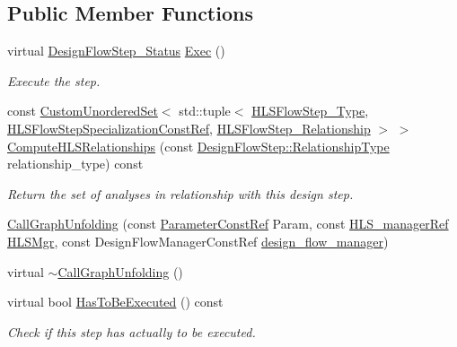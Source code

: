 \subsection*{Public Member Functions}
\begin{DoxyCompactItemize}
\item 
virtual \hyperlink{design__flow__step_8hpp_afb1f0d73069c26076b8d31dbc8ebecdf}{Design\+Flow\+Step\+\_\+\+Status} \hyperlink{classCallGraphUnfolding_a22a28a943380b9859f6006542f1929ab}{Exec} ()
\begin{DoxyCompactList}\small\item\em Execute the step. \end{DoxyCompactList}\item 
const \hyperlink{classCustomUnorderedSet}{Custom\+Unordered\+Set}$<$ std\+::tuple$<$ \hyperlink{hls__step_8hpp_ada16bc22905016180e26fc7e39537f8d}{H\+L\+S\+Flow\+Step\+\_\+\+Type}, \hyperlink{hls__step_8hpp_a5fdd2edf290c196531d21d68e13f0e74}{H\+L\+S\+Flow\+Step\+Specialization\+Const\+Ref}, \hyperlink{hls__step_8hpp_a3ad360b9b11e6bf0683d5562a0ceb169}{H\+L\+S\+Flow\+Step\+\_\+\+Relationship} $>$ $>$ \hyperlink{classCallGraphUnfolding_af8507af00670b0bd8b00b56d20c829f1}{Compute\+H\+L\+S\+Relationships} (const \hyperlink{classDesignFlowStep_a723a3baf19ff2ceb77bc13e099d0b1b7}{Design\+Flow\+Step\+::\+Relationship\+Type} relationship\+\_\+type) const
\begin{DoxyCompactList}\small\item\em Return the set of analyses in relationship with this design step. \end{DoxyCompactList}\item 
\hyperlink{classCallGraphUnfolding_a18926eb72c9ee114b6d25d651f7e4c8a}{Call\+Graph\+Unfolding} (const \hyperlink{Parameter_8hpp_a37841774a6fcb479b597fdf8955eb4ea}{Parameter\+Const\+Ref} Param, const \hyperlink{hls__manager_8hpp_acd3842b8589fe52c08fc0b2fcc813bfe}{H\+L\+S\+\_\+manager\+Ref} \hyperlink{classHLS__step_ade85003a99d34134418451ddc46a18e9}{H\+L\+S\+Mgr}, const Design\+Flow\+Manager\+Const\+Ref \hyperlink{classDesignFlowStep_ab770677ddf087613add30024e16a5554}{design\+\_\+flow\+\_\+manager})
\item 
virtual \hyperlink{classCallGraphUnfolding_a0ad20582a65bc45f2e995784c9f6825c}{$\sim$\+Call\+Graph\+Unfolding} ()
\item 
virtual bool \hyperlink{classCallGraphUnfolding_a27dfc396f756a66bfa689002aac9b943}{Has\+To\+Be\+Executed} () const
\begin{DoxyCompactList}\small\item\em Check if this step has actually to be executed. \end{DoxyCompactList}\end{DoxyCompactItemize}
